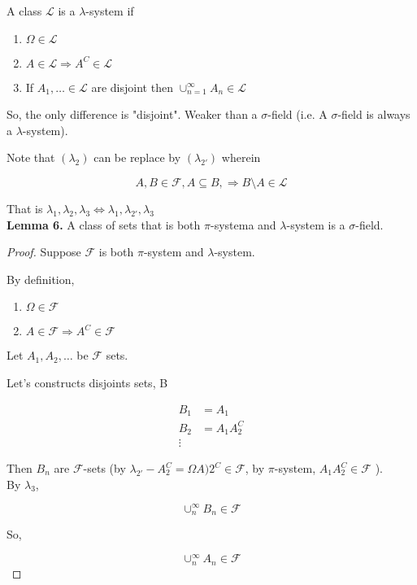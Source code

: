 \documentclass[11pt,fleqn]{book} %
\begin{document}
\begin{definition}
	A class $\mathscr{L}$ is a $\lambda$-system if 
		\begin{enumerate}[label = $\lambda$(\roman*)]
			\item $\Omega \in \mathscr{L}$ 
			\item $A \in \mathscr{L} \Rightarrow A^C \in \mathscr{L}$
			\item If $A_1, \dots \in \mathscr{L} $ are disjoint then $\cup^\infty_{n=1} A_n \in \mathscr{L}$
		\end{enumerate}
\end{definition}
	

	So, the only difference is "disjoint". Weaker than a $\sigma$-field (i.e. A $\sigma$-field is always a $\lambda$-system).

Note that $(\lambda_2)$ can be replace by $(\lambda_{2\prime})$ wherein

$$A, B \in \mathscr{F}, A \subseteq B, \Rightarrow B\setminus A \in \mathscr{L} $$

That is $\lambda_1, \lambda_2, \lambda_3 \Leftrightarrow \lambda_1, \lambda_{2\prime}, \lambda_3$\\

\textbf{Lemma 6.} A class of sets that is both $\pi$-systema and $\lambda$-system is a $\sigma$-field. 

\begin{proof}
	Suppose $\mathscr{F}$ is both $\pi$-system and $\lambda$-system.

By definition, 
\begin{enumerate}
			\item $\Omega \in \mathscr{F}$ 
			\item $A \in \mathscr{F} \Rightarrow A^C \in \mathscr{F}$
		\end{enumerate}

		Let $A_1, A_2, \dots$ be $\mathscr{F}$ sets. 

		Let's constructs disjoints sets, B

		\begin{align*}
			B_1 &= A_1\\
			B_2 &= A_1A_2^C\\
			\vdots
		\end{align*}

		Then $B_n$ are $\mathscr{F}$-sets (by $\lambda_{2\prime} - A_2^C = \Omega A)2^C \in \mathscr{F}$, by $\pi$-system, $A_1A_2^C \in \mathscr{F}$ ).\\

		By $\lambda_3$, 

		$$\cup_n^\infty B_n \in \mathscr{F} $$

		So, 

		$$\cup_n^\infty A_n \in \mathscr{F} $$

\end{proof}
\end{document}
